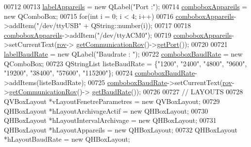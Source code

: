 \begin{DoxyCode}
00712 
00713     \hyperlink{class_i_h_m_rov_ac6f93c34da2a4e24f743e61fd5d62405}{labelAppareils} = \textcolor{keyword}{new} QLabel(\textcolor{stringliteral}{"Port :"});
00714     \hyperlink{class_i_h_m_rov_a12b970f1d2a170f14a01a684787904a5}{comboboxAppareils} = \textcolor{keyword}{new} QComboBox;
00715     \textcolor{keywordflow}{for}(\textcolor{keywordtype}{int} i = 0; i < 4; i++)
00716         \hyperlink{class_i_h_m_rov_a12b970f1d2a170f14a01a684787904a5}{comboboxAppareils}->addItem(\textcolor{stringliteral}{"/dev/ttyUSB"} + QString::number(i));
00717 
00718     \hyperlink{class_i_h_m_rov_a12b970f1d2a170f14a01a684787904a5}{comboboxAppareils}->addItem(\textcolor{stringliteral}{"/dev/ttyACM0"});
00719     \hyperlink{class_i_h_m_rov_a12b970f1d2a170f14a01a684787904a5}{comboboxAppareils}->setCurrentText(\hyperlink{class_i_h_m_rov_a777ca33fdb295ba6b6773e880356fa1e}{rov}->
      \hyperlink{class_rov_ad30543625f584e28bf785a80c59506dc}{getCommunicationRov}()->\hyperlink{class_communication_rov_a6226f9338fffc648cfca91c8e585a26b}{getPort}());
00720 
00721     \hyperlink{class_i_h_m_rov_a6e9a97a5cd38bfd92e6114c4299be7ee}{labelBaudRate} = \textcolor{keyword}{new} QLabel(\textcolor{stringliteral}{"Baudrate : "});
00722     \hyperlink{class_i_h_m_rov_a542c0cf87de612cd529b0753b60e4f95}{comboboxBaudRate} = \textcolor{keyword}{new} QComboBox;
00723     QStringList listeBaudRate = \{\textcolor{stringliteral}{"1200"}, \textcolor{stringliteral}{"2400"}, \textcolor{stringliteral}{"4800"}, \textcolor{stringliteral}{"9600"}, \textcolor{stringliteral}{"19200"}, \textcolor{stringliteral}{"38400"}, \textcolor{stringliteral}{"57600"}, \textcolor{stringliteral}{"115200"}\};
00724     \hyperlink{class_i_h_m_rov_a542c0cf87de612cd529b0753b60e4f95}{comboboxBaudRate}->addItems(listeBaudRate);
00725     \hyperlink{class_i_h_m_rov_a542c0cf87de612cd529b0753b60e4f95}{comboboxBaudRate}->setCurrentText(\hyperlink{class_i_h_m_rov_a777ca33fdb295ba6b6773e880356fa1e}{rov}->\hyperlink{class_rov_ad30543625f584e28bf785a80c59506dc}{getCommunicationRov}()->
      \hyperlink{class_communication_rov_a810de691dfc6d305f77c92ccd90bb6db}{getBaudRate}());
00726 
00727     \textcolor{comment}{// LAYOUTS}
00728     QVBoxLayout *vLayoutFenetreParametres = \textcolor{keyword}{new} QVBoxLayout;
00729     QHBoxLayout *hLayoutArchivageActif = \textcolor{keyword}{new} QHBoxLayout;
00730     QHBoxLayout *hLayoutIntervalArchivage = \textcolor{keyword}{new} QHBoxLayout;
00731     QHBoxLayout *hLayoutAppareils = \textcolor{keyword}{new} QHBoxLayout;
00732     QHBoxLayout *hLayoutBaudRate = \textcolor{keyword}{new} QHBoxLayout;

\end{DoxyCode}
